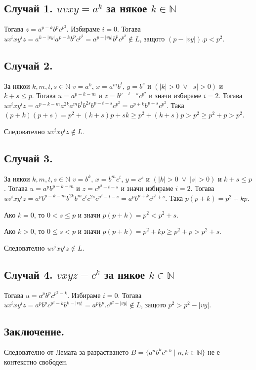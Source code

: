 \documentclass[12pt]{article}
\begin{document}
\subsection*{Случай 1. \(uvxy = a^k\) за някое \(k \in \mathbb N\)}
Тогава \(z = a^{p - k}b^pc^{p^2}\). Избираме \(i = 0\).
Тогава \(uv^ixy^iz = a^{k - |vy|}a^{p - k}b^pc^{p^2} = a^{p - |vy|}b^pc^{p^2} \notin L\),
защото \((p - |vy|).p < p^2\).

\subsection*{Случай 2.}
За някои \(k, m, t, s \in \mathbb N\) \(v = a^k\), \(x = a^mb^t\), \(y = b^s\) и \((|k| > 0 \;\lor\; |s| > 0)\) и \(k + s \leq p\).
Тогава \(u = a^{p - k - m}\) и \(z = b^{p - t - s}c^{p^2}\) и значи избираме \(i = 2\). Тогава \(uv^ixy^iz = a^{p - k - m}a^{2k}a^mb^tb^{2s}b^{p - t - s }c^{p^2} = a^{p + k}b^{p + s}c^{p^2}\).
Така \((p + k)(p + s) = p^2 + (k + s)p + sk \geq p^2 + (k + s)p > p^2 \geq p^2 + p > p^2\).

Следователно \(uv^ixy^iz \notin L\).

\subsection*{Случай 3.}

За някои \(k, m, t, s \in \mathbb N\) \(v = b^k\), \(x = b^mc^t\), \(y = c^s\) и \((|k| > 0 \;\lor\; |s| > 0)\) и \(k + s \leq p\).
Тогава \(u = a^pb^{p - k - m}\) и \(z = c^{p^2 - t - s}\) и значи избираме \(i = 2\). Тогава \(uv^ixy^iz = a^pb^{p - k - m}b^{2k}b^mc^tc^{2s}c^{p^2 - t - s } = a^pb^{p + k}c^{p^2 + s}\). Така \(p(p + k) = p^2 + kp\).

Ако \(k = 0\), то \(0 < s \leq p\) и значи \(p(p + k) = p^2 < p^2 + s\).

Ако \(k > 0\), то \(0 \leq s < p\) и значи \(p(p + k) = p^2 + kp \geq p^2 + p > p^2 + s\).

Следователно \(uv^ixy^iz \notin L\).

\subsection*{Случай 4. \(vxyz = c^k\) за някое \(k \in \mathbb N\)}

Тогава \(u = a^pb^pc^{p^2 - k}\). Избираме \(i = 0\).
Тогава \(uv^ixy^iz = a^pb^pc^{p^2 - k}b^{k - |vy|} = a^pb^p.c^{p^2 - |vy|} \notin L\),
защото \(p^2 > p^2 - |vy|\).

\subsection*{Заключение.}

Следователно от Лемата за разрастването \(B = \{a^nb^kc^{n.k} \mid n, k \in \mathbb{N}\}\) не е контекстно свободен.
\end{document}
